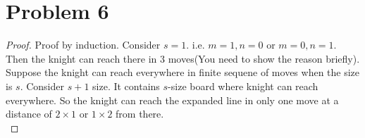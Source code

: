 \section*{Problem 6}
\begin{proof}
	Proof by induction. Consider $s = 1$. i.e. $m = 1, n = 0$ or $m = 0, n = 1$. Then the knight can reach there in 3 moves(You need to show the reason briefly).\\
	Suppose the knight can reach everywhere in finite sequene of moves when the size is $s$. Consider $s + 1$ size. It contains $s$-size board where knight can reach everywhere. So the knight can reach the expanded line in only one move at a distance of $2\times1$ or $1\times2$ from there.\\
\end{proof}